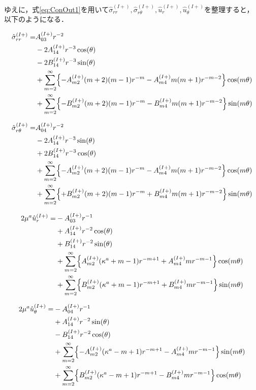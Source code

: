 ゆえに，式\eqref{eq:ConOut1}を用いて$\hat{\sigma}_{rr}^{(I+)},\hat{\sigma}_{r\theta}^{(I+)},\hat{u}_{r}^{(I+)},\hat{u}_{\theta}^{(I+)}$を整理すると，以下のようになる．

\begin{align}
	\hat{\sigma}_{rr}^{(I+)} =&A_{03}^{(I+)}r^{-2}
	\nonumber
	\\
	&-2A_{14}^{(I+)}r^{-3}\cos(\theta)
	\nonumber
	\\
	&-2B_{14}^{(I+)}r^{-3}\sin(\theta)
	\nonumber
	\\
	&+\sum_{m=2}^{\infty}\Bigl\{
	-A_{m2}^{(I+)}(m+2)(m-1)r^{-m}
	-A_{m4}^{(I+)}m(m+1)r^{-m-2}\Bigr\}\cos(m\theta)
	\nonumber
	\\
	&+\sum_{m=2}^{\infty}\Bigl\{
	-B_{m2}^{(I+)}(m+2)(m-1)r^{-m}
	-B_{m4}^{(I+)}m(m+1)r^{-m-2}\Bigr\}\sin(m\theta)
	\label{eq:SigmaRROut1}
\end{align}

\begin{align}
	\hat{\sigma}_{r\theta}^{(I+)} =&A_{04}^{(I+)}r^{-2}
	\nonumber
	\\
	&-2A_{14}^{(I+)}r^{-3}\sin(\theta)
	\nonumber
	\\
	&+2B_{14}^{(I+)}r^{-3}\cos(\theta)
	\nonumber
	\\
	&+\sum_{m=2}^{\infty}\Bigl\{
	-A_{m2}^{(I+)}(m+2)(m-1)r^{-m}
	-A_{m4}^{(I+)}m(m+1)r^{-m-2}\Bigr\}\cos(m\theta)
	\nonumber
	\\
	&+\sum_{m=2}^{\infty}\Bigl\{
	+B_{m2}^{(I+)}(m+2)(m-1)r^{-m}
	+B_{m4}^{(I+)}m(m+1)r^{-m-2}\Bigr\}\sin(m\theta)
	\label{eq:SigmaRThOut1}
\end{align}

\begin{align}
2\mu^{a}\hat{u}_{r}^{(I+)} =&-A_{03}^{(I+)}r^{-1}
\nonumber
\\
&+A_{14}^{(I+)}r^{-2}\cos(\theta)
\nonumber
\\
&+B_{14}^{(I+)}r^{-2}\sin(\theta)
\nonumber
\\
&+\sum_{m=2}^{\infty}\Bigl\{A_{m2}^{(I+)}(\kappa^{a}+m-1)r^{-m+1}
+A_{m4}^{(I+)}mr^{-m-1}\Bigr\}\cos(m\theta)
\nonumber
\\
&+\sum_{m=2}^{\infty}\Bigl\{B_{m2}^{(I+)}(\kappa^{a}+m-1)r^{-m+1}
+B_{m4}^{(I+)}mr^{-m-1}\Bigr\}\sin(m\theta)
\label{eq:UROut1}
\end{align}


\begin{align}
2\mu^{a}\hat{u}_{\theta}^{(I+)} =&-A_{04}^{(I+)}r^{-1}
\nonumber
\\
&+A_{14}^{(I+)}r^{-2}\sin(\theta)
\nonumber
\\
&-B_{14}^{(I+)}r^{-2}\cos(\theta)
\nonumber
\\
&+\sum_{m=2}^{\infty}\Bigl\{-A_{m2}^{(I+)}(\kappa^{a}-m+1)r^{-m+1}
-A_{m4}^{(I+)}mr^{-m-1}\Bigr\}\sin(m\theta)
\nonumber
\\
&+\sum_{m=2}^{\infty}\Bigl\{B_{m2}^{(I+)}(\kappa^{a}-m+1)r^{-m+1}
-B_{m4}^{(I+)}mr^{-m-1}\Bigr\}\cos(m\theta)
\label{eq:UThOut1}
\end{align}

\newpage
